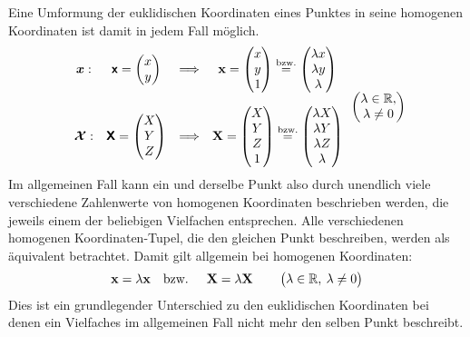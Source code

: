 {\noindent}Eine Umformung der euklidischen Koordinaten eines Punktes in seine homogenen Koordinaten ist damit in jedem Fall möglich.
\begin{equation}
	\begin{array}{c c c c}
		\boldsymbol{x}: & \boldsymbol{\mathsf{x}} = \begin{pmatrix}x\\y\\\end{pmatrix} & \Longrightarrow & \boldsymbol{\mathrm{x}} = \begin{pmatrix}x\\y\\1\\\end{pmatrix} \overset{\text{bzw.}}{=} \begin{pmatrix}{\lambda}x\\{\lambda}y\\\lambda\\\end{pmatrix}\\[0.8cm]
		\boldsymbol{\mathcal{X}}: & \boldsymbol{\mathsf{X}} = \begin{pmatrix}X\\Y\\Z\\\end{pmatrix} & \Longrightarrow & \boldsymbol{\mathrm{X}} = \begin{pmatrix}X\\Y\\Z\\1\\\end{pmatrix} \overset{\text{bzw.}}{=} \begin{pmatrix}{\lambda}X\\{\lambda}Y\\{\lambda}Z\\\lambda\\\end{pmatrix}
	\end{array}
	\begin{pmatrix}\lambda\in\mathbb{R},\\\lambda\not=0\end{pmatrix}
\end{equation}
Im allgemeinen Fall kann ein und derselbe Punkt also durch unendlich viele verschiedene Zahlenwerte von homogenen Koordinaten beschrieben werden, die jeweils einem der beliebigen Vielfachen entsprechen.
Alle verschiedenen homogenen Koordinaten-Tupel, die den gleichen Punkt beschreiben, werden als äquivalent betrachtet. Damit gilt allgemein bei homogenen Koordinaten:
\begin{equation}\label{eq:skalierbarkeit}
	\boldsymbol{\mathrm{x}} = \lambda\boldsymbol{\mathrm{x}} \text{\quad bzw. \quad} \boldsymbol{\mathrm{X}} = \lambda\boldsymbol{\mathrm{X}} \text{\qquad} \begin{pmatrix}\lambda\in\mathbb{R},\:\lambda\not=0\end{pmatrix}
\end{equation}
Dies ist ein grundlegender Unterschied zu den euklidischen Koordinaten bei denen ein Vielfaches im allgemeinen Fall nicht mehr den selben Punkt beschreibt.\kleinerabstand

